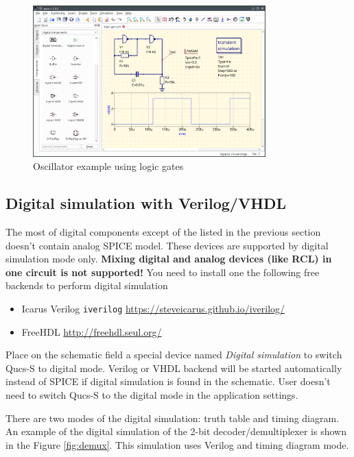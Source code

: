 \documentclass[a4paper,12pt]{article}
\begin{document}
    \begin{figure}[!ht]
    \begin{center}
        \includegraphics[width=0.8\textwidth]{img/logic_gen.png}
    \end{center}
    \caption{Oscillator example using logic gates} \label{fig:logic_gen}
    \end{figure}


\subsection{Digital simulation with Verilog/VHDL} \label{sec:digi}

The most of digital components except of the listed in the previous section doesn't contain analog SPICE model. These devices are  supported by digital simulation mode only. \textbf{Mixing digital and analog devices (like RCL) in one circuit is not supported!} You need to install one the following free backends to perform digital simulation

\begin{itemize}
 \item Icarus Verilog \verb|iverilog| \url{https://steveicarus.github.io/iverilog/}
 \item FreeHDL \url{http://freehdl.seul.org/}
\end{itemize}


Place on the schematic field a special device named \emph{Digital simulation} to switch Qucs-S to digital mode. Verilog or VHDL backend will be started automatically instead of SPICE if digital simulation is found in the schematic. User doesn't need to switch 
Qucs-S to the digital mode in the application settings. 

There are two modes of the digital simulation: truth table and timing diagram. An example of the digital simulation of the 2-bit decoder/demultiplexer is shown in the Figure \ref{fig:demux}. This simulation uses Verilog and timing diagram mode. 
\end{document}
